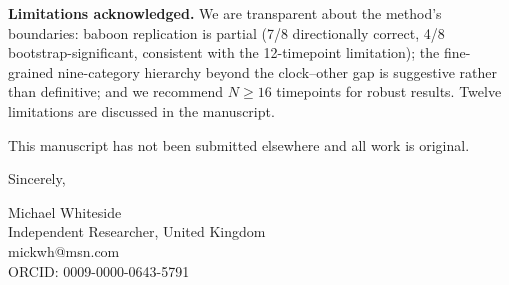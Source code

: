 \documentclass[11pt,letterpaper]{article}
\begin{document}
\vspace{0.3cm}

\textbf{Limitations acknowledged.} We are transparent about the method's boundaries: baboon replication is partial (7/8 directionally correct, 4/8 bootstrap-significant, consistent with the 12-timepoint limitation); the fine-grained nine-category hierarchy beyond the clock--other gap is suggestive rather than definitive; and we recommend $N \geq 16$ timepoints for robust results. Twelve limitations are discussed in the manuscript.

\vspace{0.3cm}

This manuscript has not been submitted elsewhere and all work is original.

\vspace{0.5cm}

Sincerely,

\vspace{0.5cm}

Michael Whiteside \\
Independent Researcher, United Kingdom \\
mickwh@msn.com \\
ORCID: 0009-0000-0643-5791
\end{document}
